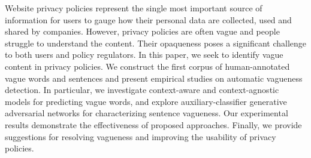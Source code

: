 Website privacy policies represent the single most important source of information for users to gauge how their personal data are collected, used and shared by companies. However, privacy policies are often vague and people struggle to understand the content. Their opaqueness poses a significant challenge to both users and policy regulators. In this paper, we seek to identify vague content in privacy policies. We construct the first corpus of human-annotated vague words and sentences and present empirical studies on automatic vagueness detection. In particular, we investigate context-aware and context-agnostic models for predicting vague words, and explore auxiliary-classifier generative adversarial networks for characterizing sentence vagueness. Our experimental results demonstrate the effectiveness of proposed approaches. Finally, we provide suggestions for resolving vagueness and improving the usability of privacy policies.

